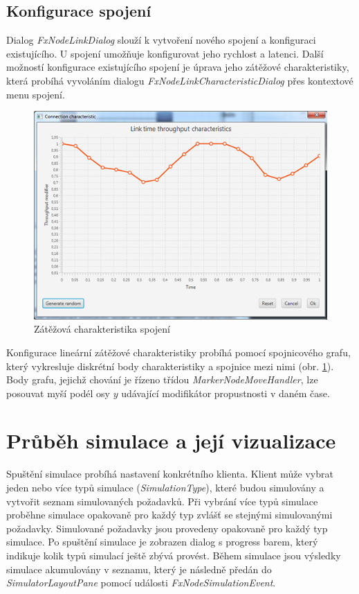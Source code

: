 \documentclass[czech,DP]{thesiskiv}
\begin{document}
\subsection{Konfigurace spojení}

Dialog \textit{FxNodeLinkDialog} slouží k vytvoření nového spojení a konfiguraci existujícího. U spojení umožňuje konfigurovat jeho rychlost a latenci. Další možností konfigurace existujícího spojení je úprava jeho zátěžové charakteristiky, která probíhá vyvoláním dialogu \textit{FxNodeLinkCharacteristicDialog} přes kontextové menu spojení. 

\begin{figure}
\centering
	\includegraphics{img/zatezova_charakteristika.png}
\caption{Zátěžová charakteristika spojení}
\label{fig:zatezova_charakteristika}
\end{figure}

Konfigurace lineární zátěžové charakteristiky probíhá pomocí spojnicového grafu, který vykresluje diskrétní body  charakteristiky a spojnice mezi nimi (obr. \ref{fig:zatezova_charakteristika}). Body grafu, jejichž chování je řízeno třídou \textit{MarkerNodeMoveHandler}, lze posouvat myší podél osy $y$ udávající modifikátor propustnosti v daném čase.

\section{Průběh simulace a její vizualizace}

Spuštění simulace probíhá nastavení konkrétního klienta. Klient může vybrat jeden nebo více typů simulace (\textit{SimulationType}), které budou simulovány a vytvořit seznam simulovaných požadavků. Při vybrání více typů simulace proběhne simulace opakovaně pro každý typ zvlášť se stejnými simulovanými požadavky. Simulované požadavky jsou provedeny opakovaně pro každý typ simulace. Po spuštění simulace je zobrazen dialog s progress barem, který indikuje kolik typů simulací ještě zbývá provést. Během simulace jsou výsledky simulace akumulovány v seznamu, který je následně předán do \textit{SimulatorLayoutPane} pomocí události \textit{FxNodeSimulationEvent}.
\end{document}
